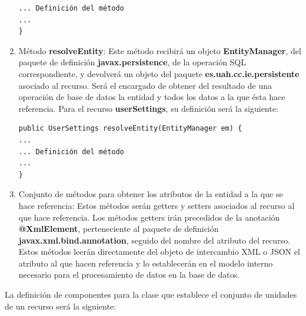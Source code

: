 \begin{enumerate}
\begin{verbatim}
... Definición del método
...
}
\end{verbatim}
\item Método \textbf{resolveEntity}: Este método recibirá un objeto \textbf{EntityManager}, del paquete de definición \textbf{javax.persistence}, de la operación SQL correspondiente, y devolverá un objeto del paquete \textbf{es.uah.cc.ie.persistente} asociado al recurso. Será el encargado de obtener del resultado de una operación de base de datos la entidad y todos los datos a la que ésta hace referencia. Para el recurso \textbf{userSettings}, su definición será la siguiente:
\begin{verbatim}
public UserSettings resolveEntity(EntityManager em) {
...
... Definición del método
...
}
\end{verbatim}
\item Conjunto de métodos para obtener los atributos de la entidad a la que se hace referencia: Estos métodos serán getters y setters asociados al recurso al que hace referencia. Los métodos getters irán precedidos de la anotación \textbf{@XmlElement}, perteneciente al paquete de definición \textbf{javax.xml.bind.annotation}, seguido del nombre del atributo del recurso. Estos métodos leerán directamente del objeto de intercambio XML o JSON el atributo al que hacen referencia y lo establecerán en el modelo interno necesario para el procesamiento de datos en la base de datos.
\end{enumerate}
\bigskip
\par
La definición de componentes para la clase que establece el conjunto de unidades de un recurso será la siguiente:

